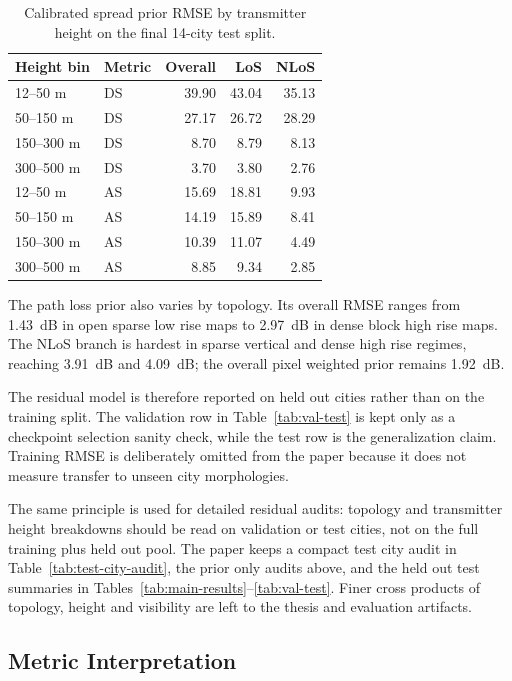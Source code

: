 \documentclass[journal]{IEEEtran}
\begin{document}
\begin{table}[!t]
\centering
\caption{Calibrated spread prior RMSE by transmitter height on the final 14-city
test split.}
\label{tab:spread-prior-height}
\scriptsize
\begin{tabular}{llrrr}
\toprule
Height bin & Metric & Overall & LoS & NLoS \\
\midrule
12--50 m & DS & 39.90 & 43.04 & 35.13 \\
50--150 m & DS & 27.17 & 26.72 & 28.29 \\
150--300 m & DS & 8.70 & 8.79 & 8.13 \\
300--500 m & DS & 3.70 & 3.80 & 2.76 \\
\midrule
12--50 m & AS & 15.69 & 18.81 & 9.93 \\
50--150 m & AS & 14.19 & 15.89 & 8.41 \\
150--300 m & AS & 10.39 & 11.07 & 4.49 \\
300--500 m & AS & 8.85 & 9.34 & 2.85 \\
\bottomrule
\end{tabular}
\end{table}

The path loss prior also varies by topology. Its overall RMSE ranges from
\SI{1.43}{dB} in open sparse low rise maps to \SI{2.97}{dB} in dense block
high rise maps. The NLoS branch is hardest in sparse vertical and dense
high rise regimes, reaching \SI{3.91}{dB} and \SI{4.09}{dB}; the overall
pixel weighted prior remains \SI{1.92}{dB}.

The residual model is therefore reported on held out cities rather than on the
training split. The validation row in Table~\ref{tab:val-test} is kept only as
a checkpoint selection sanity check, while the test row is the generalization
claim. Training RMSE is deliberately omitted from the paper because it does not
measure transfer to unseen city morphologies.

The same principle is used for detailed residual audits: topology and
transmitter height breakdowns should be read on validation or test cities, not
on the full training plus held out pool. The paper keeps a compact test city
audit in Table~\ref{tab:test-city-audit}, the prior only audits above, and the
held out test summaries in Tables~\ref{tab:main-results}--\ref{tab:val-test}.
Finer cross products of topology, height and visibility are left to the thesis
and evaluation artifacts.

\subsection{Metric Interpretation}
\end{document}
